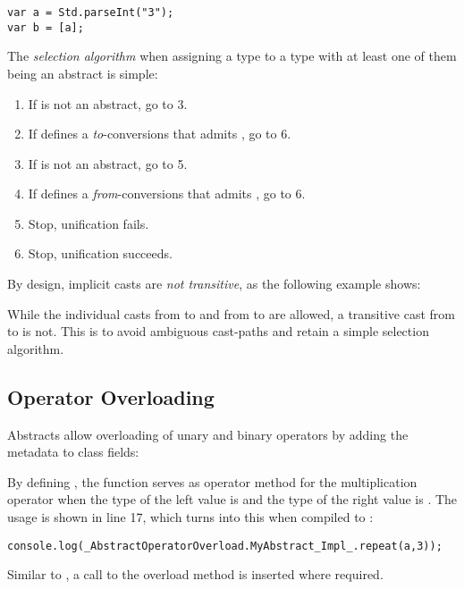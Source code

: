 \documentclass{haxe}
\begin{document}
\begin{lstlisting}
var a = Std.parseInt("3");
var b = [a];
\end{lstlisting}
The \emph{selection algorithm} when assigning a type  to a type  with at least one of them being an abstract is simple:

\begin{enumerate}
	\item If  is not an abstract, go to 3.
	\item If  defines a \emph{to}-conversions that admits , go to 6.
	\item If  is not an abstract, go to 5.
	\item If  defines a \emph{from}-conversions that admits , go to 6.
	\item Stop, unification fails.
	\item Stop, unification succeeds.
\end{enumerate}
By design, implicit casts are \emph{not transitive}, as the following example shows:

While the individual casts from  to  and from  to  are allowed, a transitive cast from  to  is not. This is to avoid ambiguous cast-paths and retain a simple selection algorithm. 




\subsection{Operator Overloading}
\label{types-abstract-operator-overloading}

Abstracts allow overloading of unary and binary operators by adding the  metadata to class fields:

By defining , the function  serves as operator method for the multiplication \expr{*} operator when the type of the left value is  and the type of the right value is . The usage is shown in line 17, which turns into this when compiled to :

\begin{lstlisting}
console.log(_AbstractOperatorOverload.MyAbstract_Impl_.repeat(a,3));
\end{lstlisting}
Similar to , a call to the overload method is inserted where required.
\end{document}

